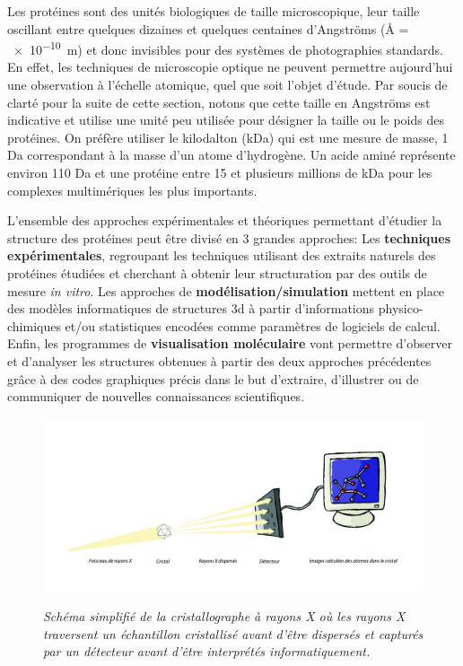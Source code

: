 Les protéines sont des unités biologiques de taille microscopique, leur taille oscillant entre quelques dizaines et quelques centaines d'Angströms (\r{A} = \SI{e-10}{\metre}) et donc invisibles pour des systèmes de photographies standards. En effet, les techniques de microscopie optique ne peuvent permettre aujourd'hui une observation à l'échelle atomique, quel que soit l'objet d'étude. Par soucis de clarté pour la suite de cette section, notons que cette taille en Angströms est indicative et utilise une unité peu utilisée pour désigner la taille ou le poids des protéines. On préfère utiliser le kilodalton (kDa) qui est une mesure de masse, 1 Da correspondant à la masse d'un atome d'hydrogène. Un acide aminé représente environ 110 Da et une protéine entre 15 et plusieurs millions de kDa pour les complexes multimériques les plus importants.

L'ensemble des approches expérimentales et théoriques permettant d'étudier la structure des protéines peut être divisé en 3 grandes approches: Les \textbf{techniques expérimentales}, regroupant les techniques utilisant des extraits naturels des protéines étudiées et cherchant à obtenir leur structuration par des outils de mesure \textit{in vitro}. Les approches de \textbf{modélisation/simulation} mettent en place des modèles informatiques de structures 3d à partir d'informations physico-chimiques et/ou statistiques encodées comme paramètres de logiciels de calcul. Enfin, les programmes de \textbf{visualisation moléculaire} vont permettre d'observer et d'analyser les structures obtenues à partir des deux approches précédentes grâce à des codes graphiques précis dans le but d'extraire, d'illustrer ou de communiquer de nouvelles connaissances scientifiques.

\begin{figure}[h]
  \centering
  {\includegraphics[width=0.9\linewidth]{./figures/ch1/cristallographie_x_ray.pdf}}
    \caption{\it Schéma simplifié de la cristallographe à rayons X où les rayons X traversent un échantillon cristallisé avant d'être dispersés et capturés par un détecteur avant d'être interprétés informatiquement.}
    \label{Fig:cristallographie_x_ray}
  \hspace{0.2cm}
\end{figure}

